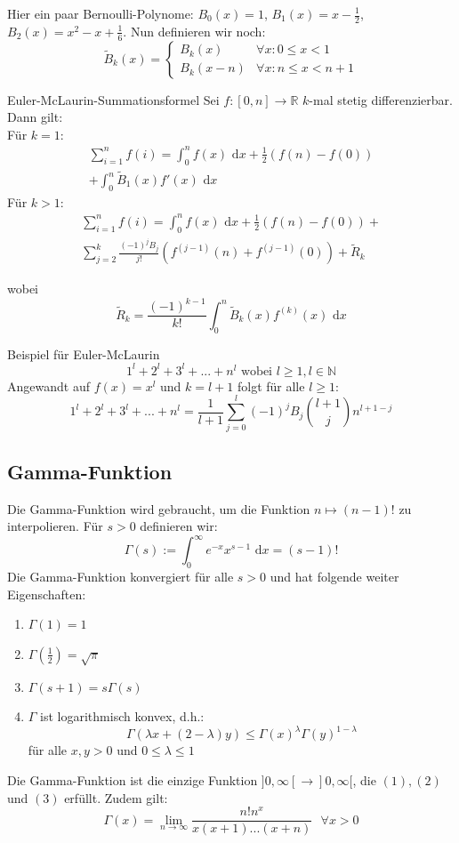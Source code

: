 \documentclass[a4paper,10pt]{article}
\def\limn{\lim_{n\to \infty}}
\def\R{\mathbb{R}}
\def\dx{\text{ d}x}
\begin{document}
Hier ein paar Bernoulli-Polynome: $B_0(x) = 1$, $B_1(x) = x - \frac{1}{2}$, $B_2(x) = x^2 - x + \frac{1}{6}$. Nun definieren wir noch: $$\tilde{B}_k(x) = \begin{cases}
  B_k(x) & \forall x: 0 \leq x < 1 \\
  B_k(x-n) & \forall x: n \leq x < n + 1
\end{cases}$$

\begin{mainbox}{Euler-McLaurin-Summationsformel}
  Sei $f: [0, n] \to \R$ $k$-mal stetig differenzierbar. Dann gilt: \\
  Für $k = 1$:
  \begin{align*}
  \sum_{i = 1}^n f(i) = \int_0^n f(x) \dx + \frac{1}{2}(f(n) - f(0)) \\ + \int_0^n \tilde{B}_1(x)f'(x)\dx
  \end{align*}
  Für $k>1$:
  \begin{align*}
  \sum_{i = 1}^n f(i) = \int_0^n f(x) \dx + \frac{1}{2}(f(n) - f(0))+ \\
  \sum_{j = 2}^k \frac{(-1)^j B_j}{j!}(f^{(j-1)}(n) + f^{(j-1)}(0)) + \tilde{R}_k
  \end{align*}
  
  wobei
  $$ \tilde{R}_k = \frac{(-1)^{k-1}}{k!} \int_0^n \tilde{B}_k(x)f^{(k)}(x)\dx$$
\end{mainbox}

\begin{subbox}{Beispiel für Euler-McLaurin}
  $$1^l + 2^l + 3^l + ... + n^l \text{ wobei } l \geq 1, l \in \mathbb{N}$$
  Angewandt auf $f(x) = x^l$ und $k = l + 1$ folgt für alle $l \geq 1$:
  $$1^l + 2^l + 3^l + ... + n^l = \frac{1}{l + 1} \sum_{j = 0}^l (-1)^j B_j {l + 1 \choose j} n^{l+1-j}$$
\end{subbox}

\subsection{Gamma-Funktion}
Die Gamma-Funktion wird gebraucht, um die Funktion $n \mapsto (n-1)!$ zu interpolieren. Für $s > 0$ definieren wir: $$\Gamma(s) := \int_0^\infty e^{-x}x^{s-1}\dx = (s-1)!$$
Die Gamma-Funktion konvergiert für alle $s > 0$ und hat folgende weiter Eigenschaften:
\begin{enumerate}
  \item $\Gamma(1) = 1$
  \item $\Gamma(\frac{1}{2}) = \sqrt{\pi}$
  \item $\Gamma(s + 1) = s \Gamma(s)$
  \item $\Gamma$ ist logarithmisch konvex, d.h.: $$\Gamma(\lambda x + (2 - \lambda)y) \leq \Gamma(x)^\lambda \Gamma(y)^{1 - \lambda}$$ für alle $x, y > 0$ und $0 \leq \lambda \leq 1$
\end{enumerate}
Die Gamma-Funktion ist die einzige Funktion $]0, \infty[ \to ]0, \infty[$, die $(1), (2)$ und $(3)$ erfüllt. Zudem gilt: $$\Gamma(x) = \limn \frac{n!n^x}{x(x+1)...(x+n)} \ \ \ \forall x > 0$$
\end{document}
